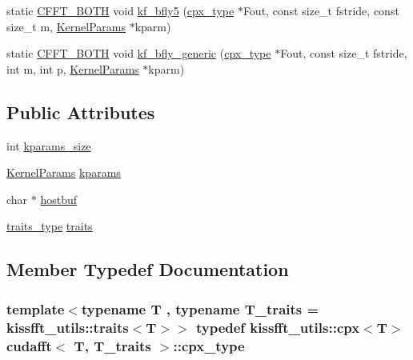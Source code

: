 \begin{DoxyCompactItemize}
\item 
static \hyperlink{cudafft_8h_ac4c6e1a008a73d82e1c532fd74830837}{C\+F\+F\+T\+\_\+\+B\+O\+TH} void \hyperlink{classcudafft_a40bbcde352f3a3ac8e931fa509880c98}{kf\+\_\+bfly5} (\hyperlink{classcudafft_a6b6e4901630f197baf4cf7f165543ece}{cpx\+\_\+type} $\ast$Fout, const size\+\_\+t fstride, const size\+\_\+t m, \hyperlink{structcudafft_1_1_kernel_params}{Kernel\+Params} $\ast$kparm)
\item 
static \hyperlink{cudafft_8h_ac4c6e1a008a73d82e1c532fd74830837}{C\+F\+F\+T\+\_\+\+B\+O\+TH} void \hyperlink{classcudafft_a10bd12be6d50bc12dd45e8d7278f98b9}{kf\+\_\+bfly\+\_\+generic} (\hyperlink{classcudafft_a6b6e4901630f197baf4cf7f165543ece}{cpx\+\_\+type} $\ast$Fout, const size\+\_\+t fstride, int m, int p, \hyperlink{structcudafft_1_1_kernel_params}{Kernel\+Params} $\ast$kparm)
\end{DoxyCompactItemize}
\subsection*{Public Attributes}
\begin{DoxyCompactItemize}
\item 
int \hyperlink{classcudafft_ab2818f49ade4d1628377b6d0539c47ab}{kparams\+\_\+size}
\item 
\hyperlink{structcudafft_1_1_kernel_params}{Kernel\+Params} \hyperlink{classcudafft_ac6c989cedd13030a91f4a92db894492d}{kparams}
\item 
char $\ast$ \hyperlink{classcudafft_a1c3a0f46edfc7749218206948373136b}{hostbuf}
\item 
\hyperlink{classcudafft_a6f6713e7fe0f79baa2fca080c37e7f4e}{traits\+\_\+type} \hyperlink{classcudafft_a8a9bd28623cdece7c8c5fa89917ad7a4}{traits}
\end{DoxyCompactItemize}


\subsection{Member Typedef Documentation}
\subsubsection[{\texorpdfstring{cpx\+\_\+type}{cpx_type}}]{\setlength{\rightskip}{0pt plus 5cm}template$<$typename T , typename T\+\_\+traits  = kissfft\+\_\+utils\+::traits$<$\+T$>$$>$ typedef {\bf kissfft\+\_\+utils\+::cpx}$<$T$>$ {\bf cudafft}$<$ T, T\+\_\+traits $>$\+::{\bf cpx\+\_\+type}}\hypertarget{classcudafft_a6b6e4901630f197baf4cf7f165543ece}{}\label{classcudafft_a6b6e4901630f197baf4cf7f165543ece}
